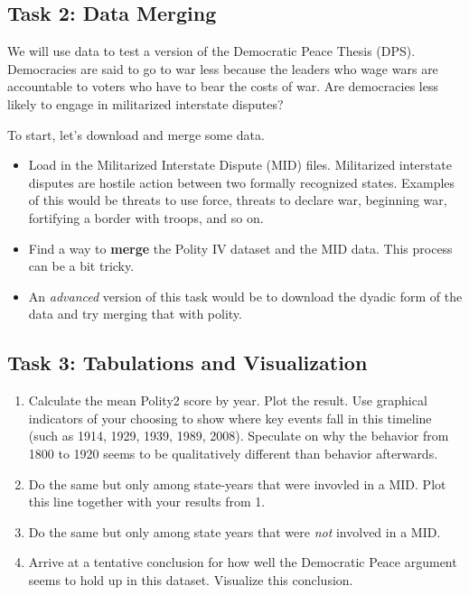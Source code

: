 \documentclass[]{book}
\newenvironment{Shaded}{\begin{snugshade}}{\end{snugshade}}
\providecommand{\tightlist}{%
  \setlength{\itemsep}{0pt}\setlength{\parskip}{0pt}}
\theoremstyle{definition}
\theoremstyle{definition}
\theoremstyle{definition}
\theoremstyle{remark}
\begin{document}
\begin{Shaded}
\begin{Highlighting}[]
\begin{Shaded}
\begin{Highlighting}[]
\begin{Shaded}
\begin{Highlighting}[]
{\subsection*{Task 2: Data Merging}\label{task-2-data-merging}}

We will use data to test a version of the Democratic Peace Thesis (DPS). Democracies are said to go to war less because the leaders who wage wars are accountable to voters who have to bear the costs of war. Are democracies less likely to engage in militarized interstate disputes?

To start, let's download and merge some data.

\begin{itemize}
\tightlist
\item
  Load in the Militarized Interstate Dispute (MID) files. Militarized interstate disputes are hostile action between two formally recognized states. Examples of this would be threats to use force, threats to declare war, beginning war, fortifying a border with troops, and so on.
\item
  Find a way to \textbf{merge} the Polity IV dataset and the MID data. This process can be a bit tricky.
\item
  An \emph{advanced} version of this task would be to download the dyadic form of the data and try merging that with polity.
\end{itemize}

\hypertarget{task-3-tabulations-and-visualization}{%
\subsection*{Task 3: Tabulations and Visualization}\label{task-3-tabulations-and-visualization}}

\begin{enumerate}
\def\labelenumi{\arabic{enumi}.}
\tightlist
\item
  Calculate the mean Polity2 score by year. Plot the result. Use graphical indicators of your choosing to show where key events fall in this timeline (such as 1914, 1929, 1939, 1989, 2008). Speculate on why the behavior from 1800 to 1920 seems to be qualitatively different than behavior afterwards.
\item
  Do the same but only among state-years that were invovled in a MID. Plot this line together with your results from 1.
\item
  Do the same but only among state years that were \emph{not} involved in a MID.
\item
  Arrive at a tentative conclusion for how well the Democratic Peace argument seems to hold up in this dataset. Visualize this conclusion.
\end{enumerate}


\end{Highlighting}
\end{Shaded}
\end{Highlighting}
\end{Shaded}
\end{Highlighting}
\end{Shaded}
\end{document}
